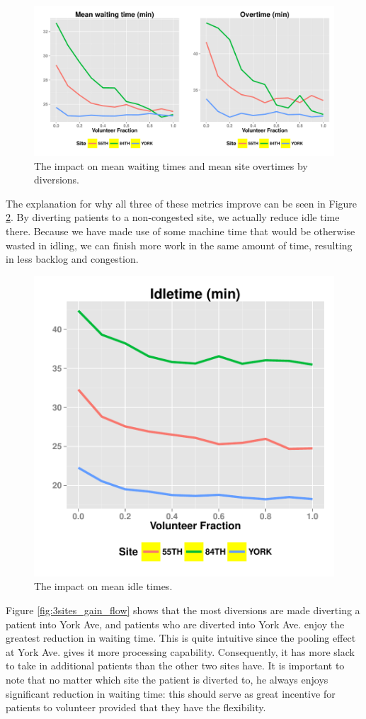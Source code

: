 \begin{figure}[htp]
\centering
\includegraphics[width=.95\textwidth]{chap3/numeric/pic/3sites_wait_over}
\caption{The impact on mean waiting times and mean site overtimes by diversions.}
\label{fig:3sites_wait_over}
\end{figure}

The explanation for why all three of these metrics improve
can be seen in Figure \ref{fig:3sites_idle}. By
diverting patients to a non-congested site, we actually reduce
idle time there. Because we have made use of some machine time that
would be otherwise wasted in idling, we can finish more work
in the same amount of time, resulting in less backlog and congestion.

\begin{figure}[htp]
\centering
\includegraphics[width=.6\textwidth]{chap3/numeric/pic/3sites_idle}
\caption{The impact on mean idle times.}
\label{fig:3sites_idle}
\end{figure}

Figure \ref{fig:3sites_gain_flow} shows that the most diversions are
made diverting a patient into York Ave, and patients who are diverted into York Ave.
enjoy the greatest reduction in waiting time. This is quite intuitive since
the pooling effect at York Ave. gives it more processing capability.
Consequently, it has more slack to take in additional patients than the other two
sites have. It is important to note that no matter which site the patient is diverted to,
he always enjoys significant reduction in waiting time: this
should serve as great incentive for patients to volunteer provided that they
have the flexibility.

